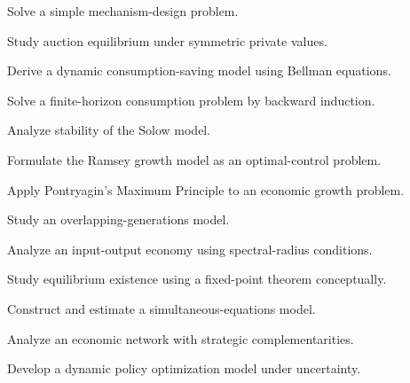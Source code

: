 \begin{exercise}[4]
Solve a simple mechanism-design problem.
\end{exercise}

\begin{exercise}[4]
Study auction equilibrium under symmetric private values.
\end{exercise}

\begin{exercise}[4]
Derive a dynamic consumption-saving model using Bellman equations.
\end{exercise}

\begin{exercise}[4]
Solve a finite-horizon consumption problem by backward induction.
\end{exercise}

\begin{exercise}[4]
Analyze stability of the Solow model.
\end{exercise}

\begin{exercise}[4]
Formulate the Ramsey growth model as an optimal-control problem.
\end{exercise}

\begin{exercise}[4]
Apply Pontryagin's Maximum Principle to an economic growth problem.
\end{exercise}

\begin{exercise}[4]
Study an overlapping-generations model.
\end{exercise}

\begin{exercise}[4]
Analyze an input-output economy using spectral-radius conditions.
\end{exercise}

\begin{exercise}[4]
Study equilibrium existence using a fixed-point theorem conceptually.
\end{exercise}

\begin{exercise}[4]
Construct and estimate a simultaneous-equations model.
\end{exercise}

\begin{exercise}[4]
Analyze an economic network with strategic complementarities.
\end{exercise}

\begin{exercise}[4]
Develop a dynamic policy optimization model under uncertainty.
\end{exercise}

